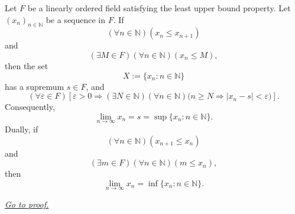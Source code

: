\begin{theorem}
\label{thm:lub-property-implies-monotone-convergence}
Let $F$ be a linearly ordered field satisfying the least upper bound property.
Let $(x_n)_{n\in\mathbb{N}}$ be a sequence in $F$.  If
\[
  (\forall n\in\mathbb{N})(x_n\leq x_{n+1})
\]
and
\[
  (\exists M\in F)(\forall n\in\mathbb{N})(x_n\leq M),
\]
then the set
\[
  X:=\{x_n:n\in\mathbb{N}\}
\]
has a supremum $s\in F$, and
\[
  (\forall\varepsilon\in F)\left[
  \varepsilon>0
  \Longrightarrow
  (\exists N\in\mathbb{N})(\forall n\in\mathbb{N})
  \bigl(n\geq N\Longrightarrow |x_n-s|<\varepsilon\bigr)
  \right].
\]
Consequently,
\[
  \lim_{n\longrightarrow\infty}x_n=s=\sup\{x_n:n\in\mathbb{N}\}.
\]
Dually, if
\[
  (\forall n\in\mathbb{N})(x_{n+1}\leq x_n)
\]
and
\[
  (\exists m\in F)(\forall n\in\mathbb{N})(m\leq x_n),
\]
then
\[
  \lim_{n\longrightarrow\infty}x_n=\inf\{x_n:n\in\mathbb{N}\}.
\]

\smallskip
\noindent
\hyperref[prf:lub-property-implies-monotone-convergence]{\textit{Go to proof.}}
\end{theorem}